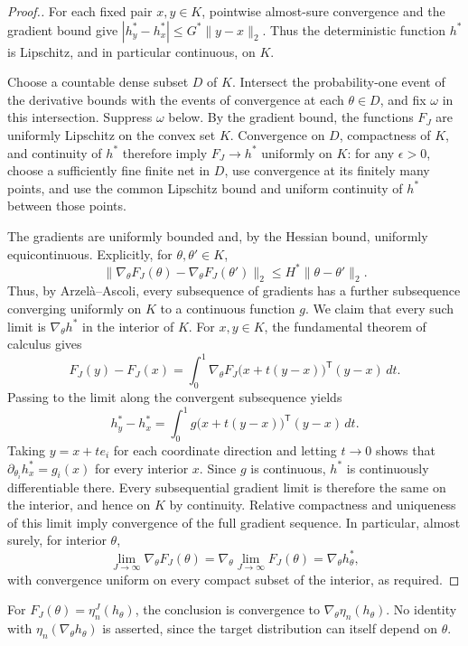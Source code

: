 \documentclass[11pt]{article}
\theoremstyle{thmstylethree}%
\begin{document}
\begin{proof}[Proof.]
For each fixed pair $x,y\in K$, pointwise almost-sure convergence and the gradient bound give $|h_y^*-h_x^*|\leq G^*\|y-x\|_2$. Thus the deterministic function $h^*$ is Lipschitz, and in particular continuous, on $K$.

Choose a countable dense subset $D$ of $K$. Intersect the probability-one event of the derivative bounds with the events of convergence at each $\theta\in D$, and fix $\omega$ in this intersection. Suppress $\omega$ below. By the gradient bound, the functions $F_J$ are uniformly Lipschitz on the convex set $K$. Convergence on $D$, compactness of $K$, and continuity of $h^*$ therefore imply $F_J\to h^*$ uniformly on $K$: for any $\epsilon>0$, choose a sufficiently fine finite net in $D$, use convergence at its finitely many points, and use the common Lipschitz bound and uniform continuity of $h^*$ between those points.

The gradients are uniformly bounded and, by the Hessian bound, uniformly equicontinuous. Explicitly, for $\theta,\theta'\in K$,
\begin{equation}
\|\nabla_\theta F_J(\theta)-\nabla_\theta F_J(\theta')\|_2
\leq H^*\|\theta-\theta'\|_2.
\end{equation}
Thus, by Arzel\`a--Ascoli, every subsequence of gradients has a further subsequence converging uniformly on $K$ to a continuous function $g$. We claim that every such limit is $\nabla_\theta h^*$ in the interior of $K$. For $x,y\in K$, the fundamental theorem of calculus gives
\begin{equation}
F_J(y)-F_J(x)
=\int_0^1\nabla_\theta F_J\bigl(x+t(y-x)\bigr)^{\mathsf T}(y-x)\,dt.
\end{equation}
Passing to the limit along the convergent subsequence yields
\begin{equation}
h_y^*-h_x^*
=\int_0^1 g\bigl(x+t(y-x)\bigr)^{\mathsf T}(y-x)\,dt.
\end{equation}
Taking $y=x+te_i$ for each coordinate direction and letting $t\to0$ shows that $\partial_{\theta_i}h_x^*=g_i(x)$ for every interior $x$. Since $g$ is continuous, $h^*$ is continuously differentiable there. Every subsequential gradient limit is therefore the same on the interior, and hence on $K$ by continuity. Relative compactness and uniqueness of this limit imply convergence of the full gradient sequence. In particular, almost surely, for interior $\theta$,
\begin{equation}
\lim_{J\to\infty}\nabla_\theta F_J(\theta)
=\nabla_\theta\lim_{J\to\infty}F_J(\theta)
=\nabla_\theta h_\theta^*,
\end{equation}
with convergence uniform on every compact subset of the interior, as required.
\end{proof}
For $F_J(\theta)=\eta_n^J(h_\theta)$, the conclusion is convergence to $\nabla_\theta\eta_n(h_\theta)$. No identity with $\eta_n(\nabla_\theta h_\theta)$ is asserted, since the target distribution can itself depend on $\theta$.
\end{document}
